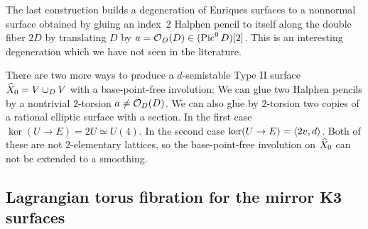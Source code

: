 \documentclass{amsart}
\begin{document}
\begin{remark}
  The last construction builds a degeneration of
  Enriques surfaces to a nonnormal surface obtained by gluing an index~$2$
  Halphen pencil to itself along the double fiber $2D$ by translating
  $D$ by $a = {\mathcal O}_D(D)\in(\operatorname{Pic}^0D)[2]$. This is an interesting degeneration
  which we have not seen in the literature. 
\end{remark}

\begin{remark}
  There are two more ways to produce a $d$-semistable Type II surface
  ${\widehat X}_0=V\cup_D V$ with a base-point-free involution: We can glue two
  Halphen pencils by a nontrivial $2$-torsion $a\ne{\mathcal O}_D(D)$. We can also glue
  by $2$-torsion two copies of a rational elliptic surface with a section. In the first
  case $\ker(U\to E) = 2U\simeq U(4)$. In the second case
  $\ker(U\to E) = \langle 2v, d\rangle$. Both of these are not $2$-elementary
  lattices, so the base-point-free involution on ${\widehat X}_0$ can not be
  extended to a smoothing.
\end{remark}



\subsection{Lagrangian torus fibration for the mirror K3 surfaces}
\label{sec:lagr-fibration}
\end{document}
